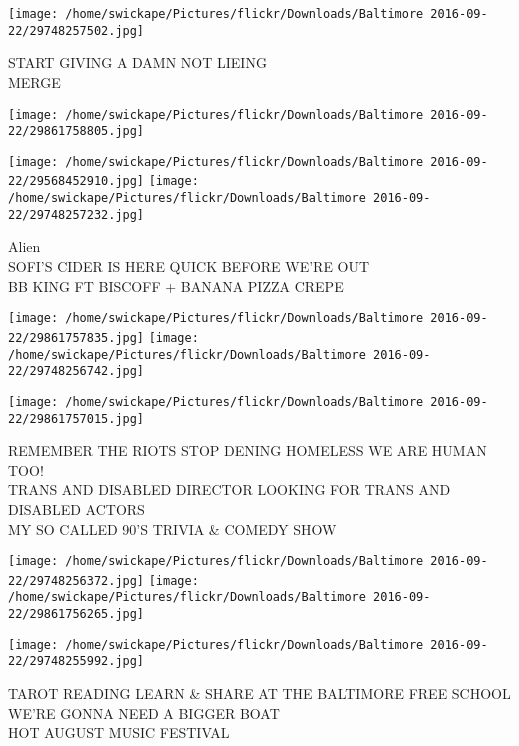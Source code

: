 \documentclass[10pt,letterpaper]{article}
\begin{document}
\vspace{0.25in}
\texttt{[image: /home/swickape/Pictures/flickr/Downloads/Baltimore 2016-09-22/29748257502.jpg]}

START GIVING A DAMN NOT LIEING\\
MERGE\\
\pagebreak

\texttt{[image: /home/swickape/Pictures/flickr/Downloads/Baltimore 2016-09-22/29861758805.jpg]}

\vspace{0.25in}
\texttt{[image: /home/swickape/Pictures/flickr/Downloads/Baltimore 2016-09-22/29568452910.jpg]}
\texttt{[image: /home/swickape/Pictures/flickr/Downloads/Baltimore 2016-09-22/29748257232.jpg]}

Alien\\
SOFI'S CIDER IS HERE QUICK BEFORE WE'RE OUT\\
BB KING FT BISCOFF + BANANA PIZZA CREPE\\
\pagebreak

\texttt{[image: /home/swickape/Pictures/flickr/Downloads/Baltimore 2016-09-22/29861757835.jpg]}
\texttt{[image: /home/swickape/Pictures/flickr/Downloads/Baltimore 2016-09-22/29748256742.jpg]}

\vspace{0.25in}
\texttt{[image: /home/swickape/Pictures/flickr/Downloads/Baltimore 2016-09-22/29861757015.jpg]}

REMEMBER THE RIOTS STOP DENING HOMELESS WE ARE HUMAN TOO!\\
TRANS AND DISABLED DIRECTOR LOOKING FOR TRANS AND DISABLED ACTORS\\
MY SO CALLED 90'S TRIVIA \& COMEDY SHOW\\
\pagebreak

\texttt{[image: /home/swickape/Pictures/flickr/Downloads/Baltimore 2016-09-22/29748256372.jpg]}
\texttt{[image: /home/swickape/Pictures/flickr/Downloads/Baltimore 2016-09-22/29861756265.jpg]}

\texttt{[image: /home/swickape/Pictures/flickr/Downloads/Baltimore 2016-09-22/29748255992.jpg]}

TAROT READING LEARN \& SHARE AT THE BALTIMORE FREE SCHOOL\\
WE'RE GONNA NEED A BIGGER BOAT\\
HOT AUGUST MUSIC FESTIVAL\\
\pagebreak
\end{document}
